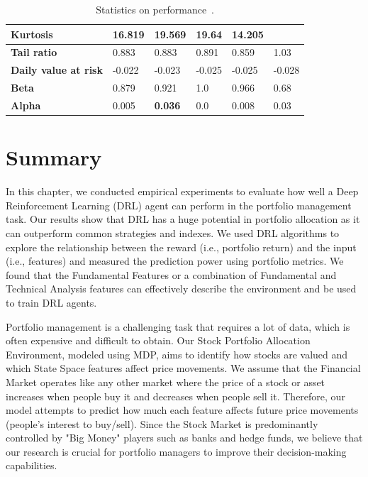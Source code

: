 \documentclass[../xlapes02]{subfiles}
\begin{document}
\begin{table}[!ht]
\begin{tabular}{|l|l|l|l|l|l|}
            \textbf{Kurtosis} & 16.819          & 19.569         & 19.64 & 14.205 & ~ \\ \hline
            \textbf{Tail ratio}                & 0.883           & 0.883          & 0.891    & 0.859  & 1.03   \\ \hline
            \textbf{Daily value at risk}               & -0.022           & -0.023 & -0.025    & -0.025  & -0.028   \\ \hline
            \textbf{Beta}               & 0.879           & 0.921 & 1.0    & 0.966  & 0.68   \\ \hline
            \textbf{Alpha}               & 0.005           & \textbf{0.036} & 0.0    & 0.008  & 0.03   \\ \hline
        \end{tabular}
        \caption{Statistics on performance~\cite{FinRL-Tutorials, Pyfolio}.}
    \end{table}


    \newpage


    \section{Summary}\label{sec:summary}
    In this chapter, we conducted empirical experiments to evaluate how well a Deep Reinforcement Learning (DRL) agent can perform in the portfolio management task. Our results show that DRL has a huge potential in portfolio allocation as it can outperform common strategies and indexes. We used DRL algorithms to explore the relationship between the reward (i.e., portfolio return) and the input (i.e., features) and measured the prediction power using portfolio metrics. We found that the Fundamental Features or a combination of Fundamental and Technical Analysis features can effectively describe the environment and be used to train DRL agents.

    Portfolio management is a challenging task that requires a lot of data, which is often expensive and difficult to obtain. Our Stock Portfolio Allocation Environment, modeled using MDP, aims to identify how stocks are valued and which State Space features affect price movements. We assume that the Financial Market operates like any other market where the price of a stock or asset increases when people buy it and decreases when people sell it. Therefore, our model attempts to predict how much each feature affects future price movements (people's interest to buy/sell). Since the Stock Market is predominantly controlled by "Big Money" players such as banks and hedge funds, we believe that our research is crucial for portfolio managers to improve their decision-making capabilities.
\end{document}

